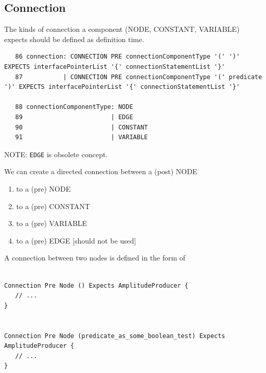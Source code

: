 \subsection{Connection}
\label{sec:MDL-Connection}

The kinds of connection a component (NODE, CONSTANT, VARIABLE) expects should be
defined as definition time. 

\begin{verbatim}
   86 connection: CONNECTION PRE connectionComponentType '(' ')' EXPECTS interfacePointerList '{' connectionStatementList '}'
   87           | CONNECTION PRE connectionComponentType '(' predicate ')' EXPECTS interfacePointerList '{' connectionStatementList '}'

   88 connectionComponentType: NODE
   89                        | EDGE
   90                        | CONSTANT
   91                        | VARIABLE
\end{verbatim}
NOTE: \verb!EDGE! is obsolete concept.

We can create a directed connection between a (post) NODE  
\begin{enumerate}
  \item to a (pre) NODE
  \item to a (pre) CONSTANT 
  \item to a (pre) VARIABLE
  \item to a (pre) EDGE  [should not be used]
\end{enumerate}


A connection between two nodes is defined in the form of
\begin{verbatim}

Connection Pre Node () Expects AmplitudeProducer {
   // ...
}


Connection Pre Node (predicate_as_some_boolean_test) Expects AmplitudeProducer {
   // ...
}

\end{verbatim}


